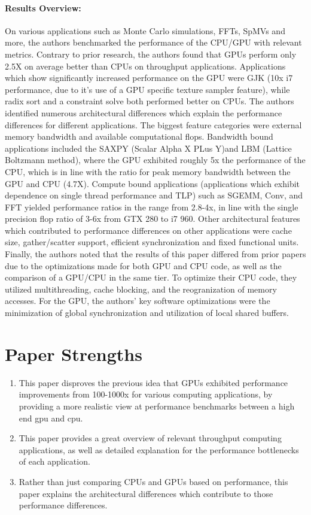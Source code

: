 \documentclass[letterpaper,twocolumn,10pt]{article}
\begin{document}
\paragraph{\bf Results Overview:}
On various applications such as Monte Carlo simulations, FFTs, SpMVs and
more, the authors benchmarked the performance of the CPU/GPU with relevant
metrics. Contrary to prior research, the authors found that GPUs perform only 2.5X
on average better than CPUs on throughput applications. Applications which
show significantly increased performance on the GPU were GJK (10x i7
performance, due to it's use of a GPU specific texture sampler feature),
while radix sort and a constraint solve both performed better on CPUs.
\newline
The authors identified numerous architectural differences which explain the
performance differences for different applications. The biggest feature
categories were external memory bandwidth and available computational flops.
Bandwidth bound applications included the SAXPY (Scalar Alpha X
PLus Y)and LBM (Lattice Boltzmann method), where the GPU exhibited roughly
5x the performance of the CPU, which is in line with the ratio for peak memory
bandwidth between the GPU and CPU (4.7X). Compute bound applications
(applications which exhibit dependence on single thread performance and TLP)
such as SGEMM, Conv, and FFT yielded performance ratios in the range
from 2.8-4x, in line with the single precision flop ratio of 3-6x from GTX
280 to i7 960. Other architectural features which contributed to
performance differences on other applications were cache size, gather/scatter support, efficient
synchronization and fixed functional units. 
\newline
Finally, the authors noted that the results of this paper differed from
prior papers due to the optimizations made for both GPU and CPU code, as
well as the comparison of a GPU/CPU in the same tier. To optimize their CPU
code, they utilized multithreading, cache blocking, and the reogranization
of memory accesses. For the GPU, the authors' key software optimizations
were the minimization of global synchronization and utilization of local
shared buffers. 
\section*{Paper Strengths}
  \begin{enumerate}
    \item This paper disproves the previous idea that GPUs exhibited performance
      improvements from 100-1000x for various computing applications, by
      providing a more realistic view at performance benchmarks between a high
      end gpu and cpu. 
    \item This paper provides a great overview of relevant throughput
      computing applications, as well as detailed explanation for the
      performance bottlenecks of each application.
    \item Rather than just comparing CPUs and GPUs based on performance,
      this paper explains the architectural differences which contribute to
      those performance differences.
  \end{enumerate}
\end{document}
